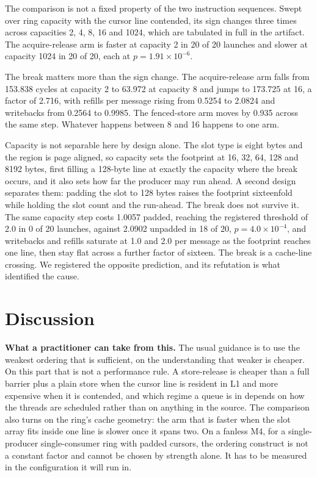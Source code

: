 \documentclass[conference]{IEEEtran}
\begin{document}
The comparison is not a fixed property of the two instruction sequences. Swept
over ring capacity with the cursor line contended, its sign changes three times
across capacities 2, 4, 8, 16 and 1024, which are tabulated in full in the
artifact. The acquire-release arm is faster at capacity 2 in 20 of 20 launches
and slower at capacity 1024 in 20 of 20, each at $p = 1.91\times10^{-6}$.

The break matters more than the sign change. The acquire-release arm falls from
153.838 cycles at capacity 2 to 63.972 at capacity 8 and jumps to 173.725 at
16, a factor of 2.716, with refills per message rising from 0.5254 to 2.0824
and writebacks from 0.2564 to 0.9985. The fenced-store arm moves by 0.935
across the same step. Whatever happens between 8 and 16 happens to one arm.

Capacity is not separable here by design alone. The slot type is eight bytes
and the region is page aligned, so capacity sets the footprint at 16, 32, 64,
128 and 8192 bytes, first filling a 128-byte line at exactly the capacity where
the break occurs, and it also sets how far the producer may run ahead. A second
design separates them: padding the slot to 128 bytes raises the footprint
sixteenfold while holding the slot count and the run-ahead. The break does not
survive it. The same capacity step costs 1.0057 padded, reaching the registered
threshold of 2.0 in 0 of 20 launches, against 2.0902 unpadded in 18 of 20,
$p = 4.0\times10^{-4}$, and writebacks and refills saturate at 1.0 and 2.0 per
message as the footprint reaches one line, then stay flat across a further
factor of sixteen. The break is a cache-line crossing. We registered the
opposite prediction, and its refutation is what identified the cause.

\section{Discussion}

\textbf{What a practitioner can take from this.} The usual guidance is to use
the weakest ordering that is sufficient, on the understanding that weaker is
cheaper. On this part that is not a performance rule. A store-release is cheaper than a full barrier plus a plain store when the
cursor line is resident in L1 and more expensive when it is contended, and
which regime a queue is in depends on how the threads are scheduled
rather than on anything in the source. The comparison also turns on the ring's cache
geometry: the arm that is faster when the slot array fits inside one line is
slower once it spans two. On a fanless M4, for a single-producer
single-consumer ring with padded cursors, the ordering construct is not a
constant factor and cannot be chosen by strength alone. It has to be measured
in the configuration it will run in.
\end{document}
